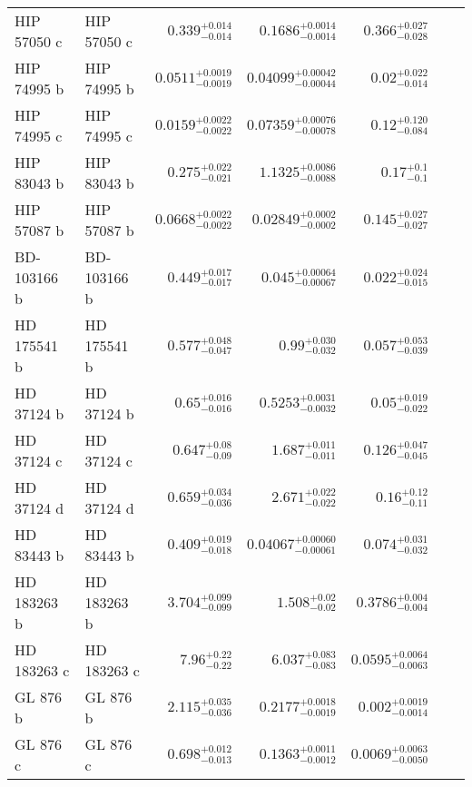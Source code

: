 \begin{longtable*}{llrrrrr}
HIP 57050 c & HIP 57050 c & $0.339^{+0.014}_{-0.014}$ & $0.1686^{+0.0014}_{-0.0014}$ & $0.366^{+0.027}_{-0.028}$ & \cite{Trifonov17} & \\ 
HIP 74995 b & HIP 74995 b & $0.0511^{+0.0019}_{-0.0019}$ & $0.04099^{+0.00042}_{-0.00044}$ & $0.02^{+0.022}_{-0.014}$ & \cite{Bonfils05} & \\ 
HIP 74995 c & HIP 74995 c & $0.0159^{+0.0022}_{-0.0022}$ & $0.07359^{+0.00076}_{-0.00078}$ & $0.12^{+0.120}_{-0.084}$ & \cite{Mayor09} & \\ 
HIP 83043 b & HIP 83043 b & $0.275^{+0.022}_{-0.021}$ & $1.1325^{+0.0086}_{-0.0088}$ & $0.17^{+0.1}_{-0.1}$ & \cite{Johnson10} & \\ 
HIP 57087 b & HIP 57087 b & $0.0668^{+0.0022}_{-0.0022}$ & $0.02849^{+0.0002}_{-0.0002}$ & $0.145^{+0.027}_{-0.027}$ & \cite{Butler04} & \\ 
BD-103166 b & BD-103166 b & $0.449^{+0.017}_{-0.017}$ & $0.045^{+0.00064}_{-0.00067}$ & $0.022^{+0.024}_{-0.015}$ & \cite{Butler00} & \\ 
HD 175541 b & HD 175541 b & $0.577^{+0.048}_{-0.047}$ & $0.99^{+0.030}_{-0.032}$ & $0.057^{+0.053}_{-0.039}$ & \cite{Johnson07} & \\ 
HD 37124 b & HD 37124 b & $0.65^{+0.016}_{-0.016}$ & $0.5253^{+0.0031}_{-0.0032}$ & $0.05^{+0.019}_{-0.022}$ & \cite{Butler03} & \\ 
HD 37124 c & HD 37124 c & $0.647^{+0.08}_{-0.09}$ & $1.687^{+0.011}_{-0.011}$ & $0.126^{+0.047}_{-0.045}$ & \cite{Butler03} & \\ 
HD 37124 d & HD 37124 d & $0.659^{+0.034}_{-0.036}$ & $2.671^{+0.022}_{-0.022}$ & $0.16^{+0.12}_{-0.11}$ & \cite{Vogt05} & \\ 
HD 83443 b & HD 83443 b & $0.409^{+0.019}_{-0.018}$ & $0.04067^{+0.00060}_{-0.00061}$ & $0.074^{+0.031}_{-0.032}$ & \cite{Butler02} & \\ 
HD 183263 b & HD 183263 b & $3.704^{+0.099}_{-0.099}$ & $1.508^{+0.02}_{-0.02}$ & $0.3786^{+0.004}_{-0.004}$ & \cite{Marcy05} & \\ 
HD 183263 c & HD 183263 c & $7.96^{+0.22}_{-0.22}$ & $6.037^{+0.083}_{-0.083}$ & $0.0595^{+0.0064}_{-0.0063}$ & \cite{Wright09} & \\ 
GL 876 b & GL 876 b & $2.115^{+0.035}_{-0.036}$ & $0.2177^{+0.0018}_{-0.0019}$ & $0.002^{+0.0019}_{-0.0014}$ & \cite{Marcy01} & \\ 
GL 876 c & GL 876 c & $0.698^{+0.012}_{-0.013}$ & $0.1363^{+0.0011}_{-0.0012}$ & $0.0069^{+0.0063}_{-0.0050}$ & \cite{Marcy01} & \\ 
\bottomrule 
\end{longtable*} 
